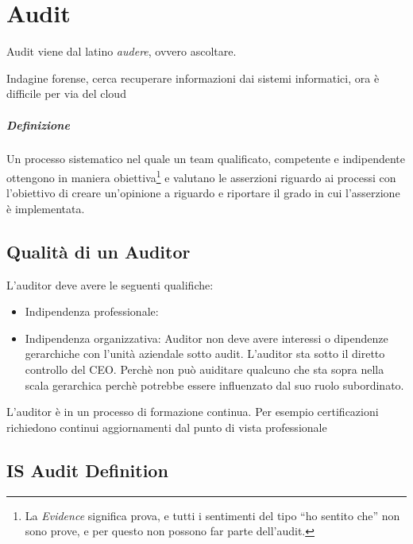 
\chapter{Audit}

Audit viene dal latino \textit{audere}, ovvero ascoltare.


Indagine forense, cerca recuperare informazioni dai sistemi informatici, ora è 
difficile per via del cloud





\paragraph*{Definizione}

Un processo sistematico nel quale un team qualificato, competente e indipendente 
ottengono in maniera obiettiva\footnote{La \textit{Evidence} significa prova, e 
tutti i sentimenti del tipo ``ho sentito che'' non sono prove, e per questo non 
possono far parte dell'audit.} e valutano le asserzioni riguardo ai processi con 
l'obiettivo di creare un'opinione a riguardo e riportare il grado in cui 
l'asserzione è implementata.


\section{Qualità di un Auditor}

L'auditor deve avere le seguenti qualifiche:
\begin{itemize}
\item Indipendenza professionale: 
\item Indipendenza organizzativa: 
Auditor non deve avere interessi o dipendenze gerarchiche con l'unità aziendale 
sotto audit. L'auditor sta sotto il diretto controllo del CEO. Perchè non può 
auiditare qualcuno che sta sopra nella scala gerarchica perchè potrebbe essere 
influenzato dal suo ruolo subordinato.
\end{itemize}


L'auditor è in un processo di formazione continua. Per esempio certificazioni 
richiedono continui aggiornamenti dal punto di vista professionale







\section{IS Audit Definition}

